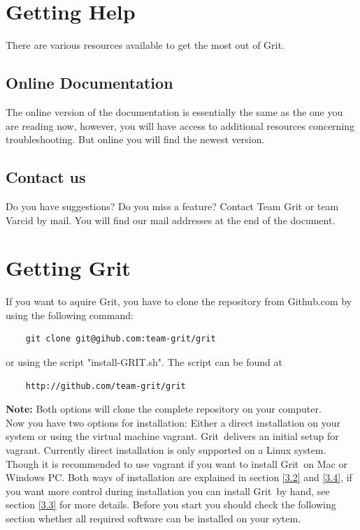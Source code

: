 \documentclass[10pt,a4paper, titlepage, toc=idx]{scrreprt}
\theoremstyle{definition}
\theoremstyle{plain}
\newcommand*{\product}{Grit}
\begin{document}
\chapter{Getting Help}
	There are various resources available to get the most out of \product. 
	\section{Online Documentation}
	The online version of the documentation is essentially the
	same as the one you are reading now, however, you will have
	access to additional resources concerning troubleshooting.
	But online you will find the newest version.
	\section{Contact us}
	Do you have suggestions? Do you miss a feature? Contact {\sc Team Grit} or {\sc team Varcid} by mail. 
	You will find our mail addresses at the end of the document.
\chapter{Getting \product}
If you want to aquire \product, you have to clone the repository from Github.com by
using the following command:
\begin{lstlisting}
	git clone git@gihub.com:team-grit/grit
\end{lstlisting}
or using the script "install-GRIT.sh". The script can be found at 
\begin{lstlisting}
	http://github.com/team-grit/grit
\end{lstlisting}
\textbf{Note:} Both options will clone the complete repository on your computer. \\

\noindent Now you have two options for installation: Either a direct installation on your system or using the virtual machine vagrant. \product\ delivers an initial setup for vagrant. Currently direct installation is only supported on a Linux system. Though it is recommended to use vagrant if you want to install \product\ on Mac or Windows PC. Both ways of installation are explained in section \ref{3.2} and \ref{3.4}, if you want more control during installation you can install \product\ by hand, see section \ref{3.3} for more details. Before you start you should check the following section whether all required software can be installed on your sytem.\\
\end{document}
